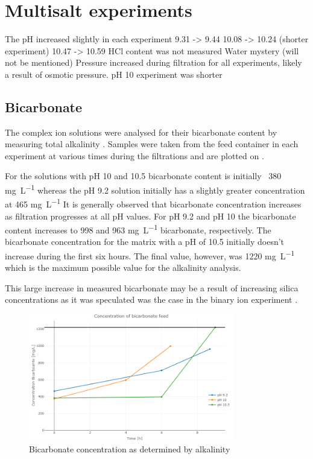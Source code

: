 \section{Multisalt experiments}

The pH increased slightly in each experiment 
9.31 -> 9.44
10.08 -> 10.24 (shorter experiment)
10.47 -> 10.59
HCl content was not measured 
Water mystery (will not be mentioned)
Pressure increased during filtration for all experiments, likely a result of osmotic pressure.
pH 10 experiment was shorter 


\subsection{Bicarbonate}

The complex ion solutions were analysed for their bicarbonate content by measuring total alkalinity .
Samples were taken from the feed container in each experiment at various times during the filtrations and are plotted on .

For the solutions with pH 10 and 10.5 bicarbonate content is initially ~380 \si{\milli\gram\per\liter} whereas the pH 9.2 solution initially has a slightly greater concentration at 465 \si{\milli\gram\per\liter}
It is generally observed that bicarbonate concentration increases as filtration progresses at all pH values.
For pH 9.2 and pH 10 the bicarbonate content increases to 998 and 963 \si{\milli\gram\per\liter} bicarbonate, respectively.
The bicarbonate concentration for the matrix with a pH of 10.5 initially doesn't increase during the first six hours.
The final value, however, was 1220 \si{\milli\gram\per\liter} which is the maximum possible value for the alkalinity analysis.

This large increase in measured bicarbonate may be a result of increasing silica concentrations as it was speculated was the case in the binary ion experiment .

\begin{figure}[H]
    \centering
    \includegraphics[width=0.8\textwidth]{Billeder/data/multi_salt/bicarbonate_all_pH.png}
    \caption{Bicarbonate concentration as determined by alkalinity}
    \label{fig:bicarbonate_multi_salt}
\end{figure}

